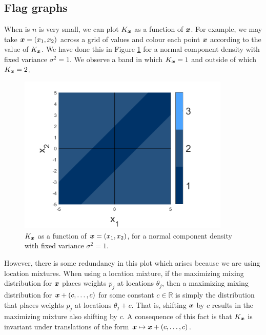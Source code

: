 

	\subsection{Flag graphs}
	\label{sec: flag graphs}
	When is $n$ is very small, we can plot $K_{\bm{{x}}}$ as a function of ${\bm{{x}}}$. For example, we may take ${\bm{{x}}} = (x_1, x_2)$ across a grid of values and colour each point ${\bm{{x}}}$ according to the value of $K_{\bm{{x}}}$. We have done this in Figure \ref{fig:normal_flag_graph_n2} for a normal component density with fixed variance $\sigma^2 = 1$. We observe a band in which $K_{\bm{{x}}} = 1$ and outside of which $K_{\bm{{x}}} = 2$.

	\begin{figure}
		\centering
		\includegraphics[width = 0.9\textwidth]{Figures/Mixtures/normal_flag_graph_n2.png}
		\caption{$K_{\bm{{x}}}$ as a function of ${\bm{{x}}} = (x_1, x_2)$, for a normal component density with fixed variance $\sigma^2 = 1$.}
		\label{fig:normal_flag_graph_n2}
	\end{figure}

	However, there is some redundancy in this plot which arises because we are using location mixtures. When using a location mixture, if the maximizing mixing distribution for ${\bm{{x}}}$ places weights $p_j$ at locations $\theta_j$, then a maximizing mixing distribution for ${\bm{{x}}} + (c, \dots, c)$ for some constant $c \in \mathbb{R}$ is simply the distribution that places weights $p_j$ at locations $\theta_j + c$. That is, shifting ${\bm{{x}}}$ by $c$ results in the maximizing mixture also shifting by $c$. A consequence of this fact is that $K_{\bm{{x}}}$ is invariant under translations of the form ${\bm{{x}}} \mapsto {\bm{{x}}} + (c, \dots, c)$.


